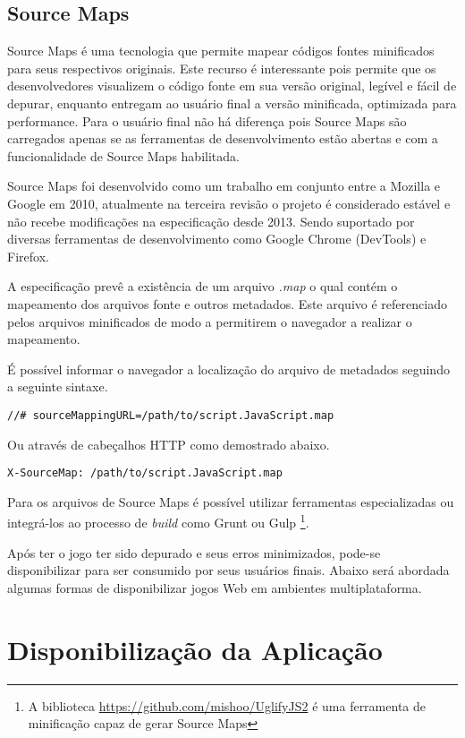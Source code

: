\subsection{Source Maps}

Source Maps é uma tecnologia que permite mapear códigos fontes
minificados para seus respectivos originais. Este recurso é
interessante pois permite que os desenvolvedores visualizem o código
fonte em sua versão original, legível e fácil de depurar, enquanto
entregam ao usuário final a versão minificada, optimizada para
performance. Para o usuário final não há diferença pois Source Maps
são carregados apenas se as ferramentas de desenvolvimento estão
abertas e com a funcionalidade de Source Maps habilitada.

Source Maps foi desenvolvido como um trabalho em conjunto entre a
Mozilla e Google em 2010, atualmente na terceira revisão o projeto é
considerado estável e não recebe modificações na especificação
desde 2013. Sendo suportado por diversas ferramentas de desenvolvimento
como Google Chrome (DevTools) e Firefox.

A especificação prevê a existência de um arquivo \textit{.map} o
qual contém o mapeamento dos arquivos fonte e outros metadados. Este
arquivo é referenciado pelos arquivos minificados de modo a permitirem
o navegador a realizar o mapeamento.

É possível informar o navegador a localização do arquivo de metadados
seguindo a seguinte sintaxe.

\begin{verbatim}
//# sourceMappingURL=/path/to/script.JavaScript.map
\end{verbatim}

Ou através de cabeçalhos HTTP como demostrado abaixo.

\begin{verbatim}
X-SourceMap: /path/to/script.JavaScript.map
\end{verbatim}

Para os arquivos de Source Maps é possível utilizar ferramentas
especializadas ou integrá-los ao processo de \textit{build} como Grunt ou Gulp
\footnote{A biblioteca \url{https://github.com/mishoo/UglifyJS2} é uma
ferramenta de minificação capaz de gerar Source Maps}.

Após ter o jogo ter sido depurado e seus erros minimizados, pode-se
disponibilizar para ser consumido por seus usuários finais.
Abaixo será abordada algumas formas de disponibilizar jogos Web em
ambientes multiplataforma.
\section{Disponibilização da Aplicação}\label{disponibilization}

